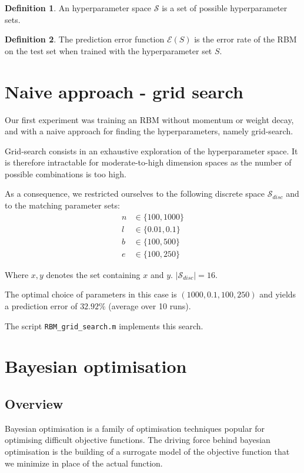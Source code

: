 \documentclass[10pt,a4paper, twocolumn]{article}
\theoremstyle{definition}
\newtheorem{defn}{Definition}
\begin{document}
\begin{defn}
An hyperparameter space $\mathcal{S}$ is a set of possible hyperparameter sets.
\end{defn}

\begin{defn}
The prediction error function $\mathcal{E}(S)$ is the error rate of the RBM on the test set when trained with the hyperparameter set $S$.
\end{defn}

\section{Naive approach - grid search}
Our first experiment was training an RBM without momentum or weight decay, and with a naive approach for finding the hyperparameters, namely grid-search.

Grid-search consists in an exhaustive exploration of the hyperparameter space. It is therefore intractable for moderate-to-high dimension spaces as the number of possible combinations is too high.

As a consequence, we restricted ourselves to the following discrete space $\mathcal{S}_{disc}$ and to the matching parameter sets:
\begin{align*}
n & \in \{100, 1000\}\\
l & \in \{0.01, 0.1\}\\
b & \in \{100, 500\}\\
e & \in \{100, 250\}
\end{align*}

Where ${x, y}$ denotes the set containing $x$ and $y$. $|\mathcal{S}_{disc}| = 16$.

The optimal choice of parameters in this case is $(1000, 0.1, 100, 250)$ and yields a prediction error of $32.92\%$ (average over 10 runs).

The script \texttt{RBM\_grid\_search.m} implements this search.

\section{Bayesian optimisation}
\subsection{Overview}
Bayesian optimisation is a family of optimisation techniques popular for optimising difficult objective functions. The driving force behind bayesian optimisation is the building of a surrogate model of the objective function that we minimize in place of the actual function.
\end{document}
